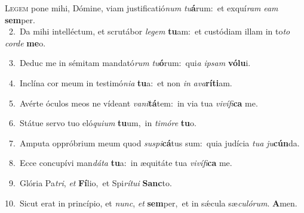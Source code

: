 \lettrine{\initial\textcolor{\initialcolor}{L}}{egem} pone mihi, Dómine, viam justificatió\textit{num} \textit{tu}\-\textbf{á}rum:~\star et exquí\textit{ram} \textit{e}\-\textit{am} \textbf{sem}\-per.\\
{\numbfont\textcolor{\numbcolor}{~2.}}~Da mihi intelléctum, et scrutábor \textit{le}\-\textit{gem} \textbf{tu}\-am:~\star et custódiam illam in to\textit{to} \textit{cor}\-\textit{de} \textbf{me}\-o.\par
{\numbfont\textcolor{\numbcolor}{~3.}}~Deduc me in sémitam mandató\textit{rum} \textit{tu}\-\textbf{ó}rum:~\star qui\textit{a} \textit{ip}\-\textit{sam} \textbf{vó}\-\textbf{lu}i.\par
{\numbfont\textcolor{\numbcolor}{~4.}}~Inclína cor meum in testimó\-\textit{ni}\-\textit{a} \textbf{tu}\-a:~\star et non \textit{in} \textit{a}\-\textit{va}\textbf{rí}\textbf{ti}am.\par
{\numbfont\textcolor{\numbcolor}{~5.}}~Avérte óculos meos ne vídeant \textit{va}\-\textit{ni}\textbf{tá}tem:~\star in via tua \textit{vi}\-\textit{ví}\textit{fi}\textbf{ca} me.\par
{\numbfont\textcolor{\numbcolor}{~6.}}~Státue servo tuo eló\-\textit{qui}\-\textit{um} \textbf{tu}\-um,~\star in \textit{ti}\-\textit{mó}\textit{re} \textbf{tu}\-o.\par
{\numbfont\textcolor{\numbcolor}{~7.}}~Amputa oppróbrium meum quod \textit{su}\-\textit{spi}\textbf{cá}tus sum:~\star quia judícia \textit{tu}\-\textit{a} \textit{ju}\-\textbf{cún}da.\par
{\numbfont\textcolor{\numbcolor}{~8.}}~Ecce concupívi man\-\textit{dá}\-\textit{ta} \textbf{tu}\-a:~\star in æquitáte tua \textit{vi}\-\textit{ví}\textit{fi}\textbf{ca} me.\par
{\numbfont\textcolor{\numbcolor}{~9.}}~Glória Pa\-\textit{tri}\-, \textit{et} \textbf{Fí}\-lio,~\star et Spi\-\textit{rí}\-\textit{tu}\textit{i} \textbf{Sanc}\-to.\par
{\numbfont\textcolor{\numbcolor}{10.}}~Sicut erat in princípio, et \textit{nunc}\-, \textit{et} \textbf{sem}\-per,~\star et in sǽcula sæ\-\textit{cu}\-\textit{ló}\textit{rum}. \textbf{A}\-men.\par
